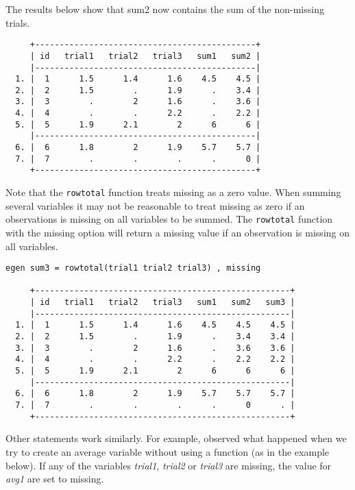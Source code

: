 The results below show that sum2 now contains the sum of the non-missing trials.

\begin{lstlisting}
     +---------------------------------------------+
     | id   trial1   trial2   trial3   sum1   sum2 |
     |---------------------------------------------|
  1. |  1      1.5      1.4      1.6    4.5    4.5 |
  2. |  2      1.5        .      1.9      .    3.4 |
  3. |  3        .        2      1.6      .    3.6 |
  4. |  4        .        .      2.2      .    2.2 |
  5. |  5      1.9      2.1        2      6      6 |
     |---------------------------------------------|
  6. |  6      1.8        2      1.9    5.7    5.7 |
  7. |  7        .        .        .      .      0 |
     +---------------------------------------------+
\end{lstlisting}

Note that the \lstinline{rowtotal} function treats missing as a zero value. When summing several variables it may not be reasonable to treat missing as zero if an observations is missing on all variables to be summed. The \lstinline{rowtotal} function with the missing option will return a missing value if an observation is missing on all variables.

\begin{lstlisting}
egen sum3 = rowtotal(trial1 trial2 trial3) , missing

     +----------------------------------------------------+
     | id   trial1   trial2   trial3   sum1   sum2   sum3 |
     |----------------------------------------------------|
  1. |  1      1.5      1.4      1.6    4.5    4.5    4.5 |
  2. |  2      1.5        .      1.9      .    3.4    3.4 |
  3. |  3        .        2      1.6      .    3.6    3.6 |
  4. |  4        .        .      2.2      .    2.2    2.2 |
  5. |  5      1.9      2.1        2      6      6      6 |
     |----------------------------------------------------|
  6. |  6      1.8        2      1.9    5.7    5.7    5.7 |
  7. |  7        .        .        .      .      0      . |
     +----------------------------------------------------+
\end{lstlisting}

Other statements work similarly. For example, observed what happened when we try to create an average variable without using a function (as in the example below). If any of the variables \textit{trial1}, \textit{trial2} or \textit{trial3} are missing, the value for \textit{avg1} are set to missing.

